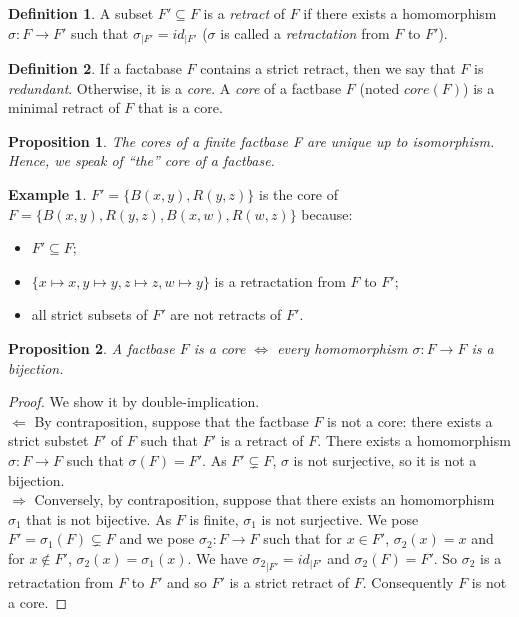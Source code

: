 \documentclass{article}
\newtheorem{proposition}{Proposition}[section]
\theoremstyle{definition}
\newtheorem{definition}{Definition}[section]
\newtheorem{example}{Example}[section]
\theoremstyle{remark}
\begin{document}
\begin{definition}
A subset $F' \subseteq F$ is a \emph{retract} of $F$ if there exists a homomorphism $\sigma:F \to F'$ such that $\sigma_{|F'}=id_{|F'}$ ($\sigma$ is called a \emph{retractation} from $F$ to $F'$).
\end{definition}

\begin{definition}
If a factabase $F$ contains a strict retract, then we say that $F$ is \emph{redundant}. Otherwise, it is a \emph{core}. A \emph{core} of a factbase $F$ (noted \emph{$\textit{core}(F)$}) is a minimal retract of $F$ that is a core.
\end{definition}

\begin{proposition}
The cores of a finite factbase F are unique up to isomorphism. Hence, we speak of ``the'' core of a factbase.
\end{proposition}


\begin{example}
$F' = \{B(x,y),R(y,z)\}$ is the core of $F = \{B(x,y),R(y,z),B(x,w),R(w,z)\}$ because:
\begin{itemize}
\item $F' \subseteq F$;
\item $\{x \mapsto x, y \mapsto y, z \mapsto z, w \mapsto y\}$ is a retractation from $F$ to $F'$;
\item all strict subsets of $F'$ are not retracts of $F'$.
\end{itemize}
\end{example}

\begin{proposition}
A factbase $F$ is a core $\Leftrightarrow$ every homomorphism $\sigma: F \to F$ is a bijection.
\end{proposition}

\begin{proof}
We show it by double-implication. \\
$\boxed{\Leftarrow}$ By contraposition, suppose that the factbase $F$ is not a core: there exists a strict substet $F'$ of $F$ such that $F'$ is a retract of $F$. There exists a homomorphism $\sigma:F \to F$ such that $\sigma(F) = F'$. As $F' \subsetneq F$, $\sigma$ is not surjective, so it is not a bijection. \\
$\boxed{\Rightarrow}$ Conversely, by contraposition, suppose that there exists an homomorphism $\sigma_1$ that is not bijective. As $F$ is finite, $\sigma_1$ is not surjective. We pose $F' = \sigma_1(F)\subsetneq F$ and we pose $\sigma_2:F \to F$ such that for $x \in F'$, $\sigma_2(x) = x$ and for $x \notin F'$, $\sigma_2(x) = \sigma_1(x)$. We have ${\sigma_2}_{|F'} = id_{|F'}$ and $\sigma_2(F) = F'$. So $\sigma_2$ is a retractation from $F$ to $F'$ and so $F'$ is a strict retract of $F$. Consequently $F$ is not a core.
\end{proof}
\end{document}
